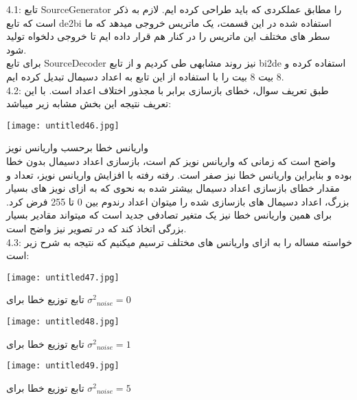 4.1:
تابع SourceGenerator را مطابق عملکردی که باید طراحی کرده ایم. لازم به ذکر است که تابع de2bi استفاده شده در این قسمت، یک ماتریس خروجی میدهد که ما سطر های مختلف این ماتریس را در کنار هم قرار داده ایم تا خروجی دلخواه تولید شود.
\\
برای تابع SourceDecoder نیز روند مشابهی طی کردیم و از تابع bi2de استفاده کرده و 8 بیت 8 بیت را با استفاده از این تابع به اعداد دسیمال تبدیل کرده ایم.
\\[0.5cm]
\large
4.2:
طبق تعریف سوال، خطای بازسازی برابر با مجذور اختلاف اعداد است. با این تعریف نتیجه این بخش مشابه زیر میباشد:

\begin{center}
    \texttt{[image: untitled46.jpg]}
\end{center}

\centering
واریانس خطا برحسب واریانس نویز
\\[1cm]
\justify
واضح است که زمانی که واریانس نویز کم است، بازسازی اعداد دسیمال بدون خطا بوده و بنابراین واریانس خطا نیز صفر است. رفته رفته با افزایش واریانس نویز، تعداد و مقدار خطای بازسازی اعداد دسیمال بیشتر شده به نحوی که به ازای نویز های بسیار بزرگ، اعداد دسیمال های بازسازی شده را میتوان اعداد رندوم بین 0 تا 255 فرض کرد. برای همین واریانس خطا نیز یک متغیر تصادفی جدید است که میتواند مقادیر بسیار بزرگی اتخاذ کند که در تصویر نیز واضح است.
\\[0.5cm]
\large
4.3:
خواسته مساله را به ازای واریانس های مختلف ترسیم میکنیم که نتیجه به شرح زیر است:

\begin{center}
    \texttt{[image: untitled47.jpg]}
\end{center}

\centering
تابع توزیع خطا برای ${\sigma^2}_{noise} = 0$
\\[1cm]


\begin{center}
    \texttt{[image: untitled48.jpg]}
\end{center}

\centering
تابع توزیع خطا برای ${\sigma^2}_{noise} = 1$
\\[1cm]


\begin{center}
    \texttt{[image: untitled49.jpg]}
\end{center}

\centering
تابع توزیع خطا برای ${\sigma^2}_{noise} = 5$
\\[1cm]


